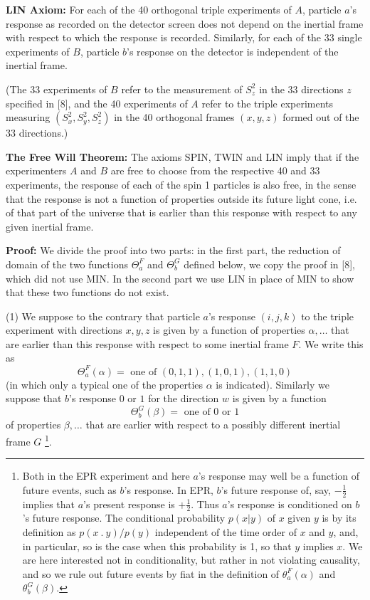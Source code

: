 \documentclass[12pt]{article}
\begin{document}
{\bf LIN Axiom:} For each of the 40 orthogonal triple experiments of $A$, particle $a$'s response as recorded on the detector screen does not depend on the inertial frame with respect to which the response is recorded. Similarly, for each of the 33 single experiments of $B$, particle $b$'s response on the detector is independent of the inertial frame.

(The 33 experiments of $B$ refer to the measurement of $S_z^2$ in the 33 directions $z$ specified in [8], and the 40 experiments of $A$ refer to the triple experiments measuring $(S_x^2, S_y^2, S_z^2)$ in the 40 orthogonal frames $(x,y,z)$ formed out of the 33 directions.)

{\bf The Free Will Theorem:}  The axioms SPIN, TWIN and LIN imply that if the experimenters $A$ and $B$ are free to choose from the respective 40 and 33 experiments, the response of each of the spin 1 particles is also free, in the sense that the response is not a function of properties outside its future light cone, i.e. of that part of the universe that is earlier than this response with respect to any given inertial frame.

{\bf Proof:}  We divide the proof into two parts: in the first part, the reduction of domain of the two functions $\Theta_a^F$ and $\Theta_b^G$ defined below, we copy the proof in [8], which did not use MIN. In the second part we use LIN in place of MIN to show that these two functions do not exist. 


(1) We suppose to the contrary that particle $a$'s response $(i, j, k)$ to the triple experiment with directions $x, y, z$ is given by a function of properties $\alpha, \ldots$ that are earlier than this response with respect to some inertial frame $F$. We write this as \[\Theta_a^F(\alpha) = \mbox{ one of } (0,1,1),(1,0,1),(1,1,0)\] (in which only a typical one of the properties $\alpha$ is indicated). Similarly we suppose that $b$'s response $0$ or $1$ for the direction $w$ is given by a function \[\Theta^G_b(\beta)= \mbox{ one of } 0 \mbox{ or } 1\] of properties $\beta, \ldots$ that are earlier with respect to a possibly different inertial frame $G$  \footnote{Both in the EPR experiment and here $a$'s response may well be a function of future events, such as $b$'s response. In EPR, $b$'s future response of, say, $ -\frac{1}{2}$  implies that $a$'s present response is $+\frac{1}{2}$. Thus $a$'s response is conditioned on $b$'s future response. The conditional probability $p(x|y)$ of $x$ given $y$ is by its definition as $p(x\ .\ y)/p(y)$ independent of the time order of $x$ and $y$, and, in particular, so is the case when this probability is 1, so that $y$ implies $x$. We are here interested not in conditionality, but rather in not violating causality, and so we rule out future events by fiat in the definition of $\theta_a^F(\alpha)$ and $\theta_b^G(\beta).$  }. 
\end{document}
